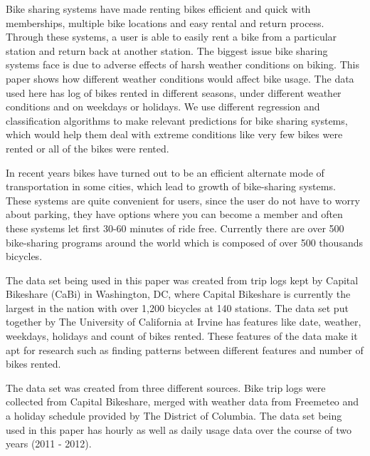 \documentclass[12pt]{article}
\author{\theauthor}
\newcommand{\ci}[1]{\cite{#1}}
\begin{document}
\maketitle
\thispagestyle{empty}
\tableofcontents


Bike sharing systems have made renting bikes efficient and quick with
memberships, multiple bike locations and easy rental and return
process. Through these systems, a user is able to easily rent a bike from a
particular station and return back at another station. The biggest issue bike
sharing systems face is due to adverse effects of harsh weather conditions on
biking. This paper shows how different weather conditions would affect bike
usage. The data used here has log of bikes rented in different seasons, under
different weather conditions and on weekdays or holidays. We use different
regression and classification algorithms to make relevant predictions for bike
sharing systems, which would help them deal with extreme conditions like very
few bikes were rented or all of the bikes were rented.



In recent years bikes have turned out to be an efficient alternate mode of
transportation in some cities, which lead to growth of bike-sharing
systems. These systems are quite convenient for users, since the user do not
have to worry about parking, they have options where you can become a member
and often these systems let first 30-60 minutes of ride free. Currently there
are over 500 bike-sharing programs around the world which is composed of over
500 thousands bicycles\ci{ucibikeshare}.

The data set being used in this paper was created from trip logs kept by
Capital Bikeshare (CaBi) in Washington, DC, where Capital Bikeshare is
currently the largest in the nation with over 1,200 bicycles at 140
stations. The data set put together by The University of California at Irvine
has features like date, weather, weekdays, holidays and count of bikes
rented. These features of the data make it apt for research such as finding
patterns between different features and number of bikes rented.

The data set was created from three different sources. Bike trip logs were
collected from Capital Bikeshare, merged with weather data from Freemeteo and a
holiday schedule provided by The District of Columbia. The data set being used
in this paper has hourly as well as daily usage data over the course of two
years (2011 - 2012).
\end{document}

